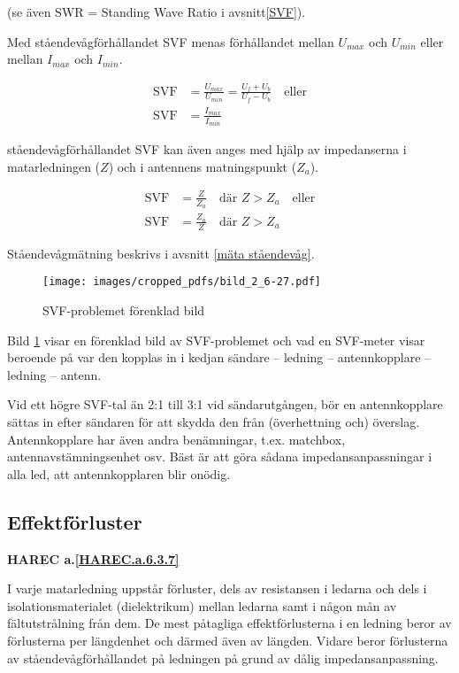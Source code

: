 (se även SWR = Standing Wave Ratio i avsnitt\ref{SVF}).

Med ståendevågförhållandet SVF menas förhållandet mellan \(U_{max}\)
och \(U_{min}\) eller mellan \(I_{max}\) och \(I_{min}\).

\begin{align*}
  \text{SVF} &= \frac{U_{max}}{U_{min}} = \frac{U_f + U_b}{U_f - U_b} \quad
  \text{eller} \\
  \text{SVF} &= \frac{I_{max}}{I_{min}}
\end{align*}

ståendevågförhållandet SVF kan även anges med hjälp av impedanserna i
matarledningen (\(Z\)) och i antennens matningspunkt (\(Z_a\)).

\begin{align*}
  \text{SVF} &= \frac{Z}{Z_a} \quad \text{där } Z > Z_a \quad \text{eller} \\
  \text{SVF} &= \frac{Z_a}{Z} \quad \text{där } Z > Z_a
\end{align*}

Ståendevågmätning beskrivs i avsnitt \ref{mäta ståendevåg}.

\begin{figure}
  \texttt{[image: images/cropped\_pdfs/bild\_2\_6-27.pdf]}
  \caption{SVF-problemet förenklad bild}
  \label{fig:bildII6-27}
\end{figure}

Bild \ref{fig:bildII6-27} visar en förenklad bild av SVF-problemet och vad en
SVF-meter visar beroende på var den kopplas in i kedjan sändare -- ledning --
antennkopplare -- ledning -- antenn.

Vid ett högre SVF-tal än 2:1 till 3:1 vid sändarutgången, bör en antennkopplare
sättas in efter sändaren för att skydda den från (överhettning och) överslag.
Antennkopplare har även andra benämningar, t.ex. matchbox,
antennavstämningsenhet osv.
Bäst är att göra sådana impedansanpassningar i alla led, att antennkopplaren
blir onödig.

\subsection{Effektförluster}
\textbf{
HAREC a.\ref{HAREC.a.6.3.7}\label{myHAREC.a.6.3.7}
}

I varje matarledning uppstår förluster, dels av resistansen i ledarna
och dels i isolationsmaterialet (dielektrikum) mellan ledarna samt i
någon mån av fältutstrålning från dem.
De mest påtagliga effektförlusterna i en ledning beror av förlusterna per
längdenhet och därmed även av längden.
Vidare beror förlusterna av ståendevågförhållandet på ledningen på grund av
dålig impedansanpassning.

